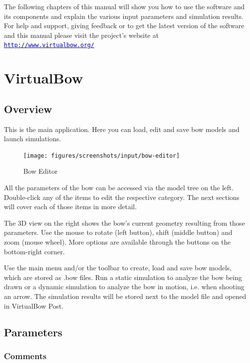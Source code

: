 \documentclass[12pt]{article}
\newcommand{\website}{\href{http://www.virtualbow.org/}{\texttt{\textcolor{blue}{http://www.virtualbow.org/}}}}
\begin{document}
\bigskip

The following chapters of this manual will show you how to use the software and its components and explain the various input parameters and simulation results. For help and support, giving feedback or to get the latest version of the software and this manual please visit the project's website at \website

\newpage
\section{VirtualBow}

\subsection{Overview}

This is the main application.
Here you can load, edit and save bow models and launch simulations.

\begin{figure}[H]
\centering
\texttt{[image: figures/screenshots/input/bow-editor]}
\caption{Bow Editor}
\label{fig:bow-editor}
\end{figure}

All the parameters of the bow can be accessed via the model tree on the left.
Double-click any of the items to edit the respective category.
The next sections will cover each of those items in more detail.

The 3D view on the right shows the bow's current geometry resulting from those parameters.
Use the mouse to rotate (left button), shift (middle button) and zoom (mouse wheel).
More options are available through the buttons on the bottom-right corner.

Use the main menu and/or the toolbar to create, load and save bow models, which are stored as .bow files.
Run a static simulation to analyze the bow being drawn or a dynamic simulation to analyze the bow in motion, i.e. when shooting an arrow.
The simulation results will be stored next to the model file and opened in VirtualBow Post.

\newpage
\subsection{Parameters}

\subsubsection{Comments}
\end{document}
